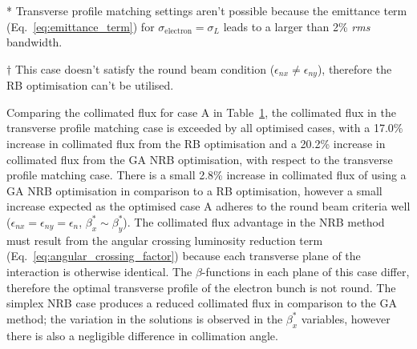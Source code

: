 \documentclass[../main.tex]{subfiles}
\begin{document}
\begin{table}[!h]
\begin{threeparttable}
\begin{tabular}{lccccc}
\hline\hline
\end{tabular}
\begin{tablenotes}
\item[*]{Transverse profile matching settings aren't possible because the emittance term (Eq.~\ref{eq:emittance_term}) for $\sigma_{\mathrm{electron}} = \sigma_{L}$ leads to a larger than 2\% \textit{rms} bandwidth.}
\item[$\dagger$]{This case doesn't satisfy the round beam condition ($\epsilon_{nx} \neq \epsilon_{ny}$), therefore the RB optimisation can't be utilised.}
\end{tablenotes}
\end{threeparttable}
\label{tab:single_point_optimisations}
\end{table}

Comparing the collimated flux for case A in Table~\ref{tab:single_point_optimisations}, the collimated flux in the transverse profile matching case is exceeded by all optimised cases, with a 17.0\% increase in collimated flux from the RB optimisation and a 20.2\% increase in collimated flux from the GA NRB optimisation, with respect to the transverse profile matching case. There is a small 2.8\% increase in collimated flux of using a GA NRB optimisation in comparison to a RB optimisation, however a small increase expected as the optimised case A adheres to the round beam criteria well ($\epsilon_{nx}=\epsilon_{ny}=\epsilon_{n}$, $\beta_{x}^{*}\sim\beta_{y}^{*}$). The collimated flux advantage in the NRB method must result from the angular crossing luminosity reduction term (Eq.~\ref{eq:angular_crossing_factor}) because each transverse plane of the interaction is otherwise identical. The $\beta$-functions in each plane of this case differ, therefore the optimal transverse profile of the electron bunch is not round. The simplex NRB case produces a reduced collimated flux in comparison to the GA method; the variation in the solutions is observed in the $\beta_{x}^{*}$ variables, however there is also a negligible difference in collimation angle. 
\end{document}
